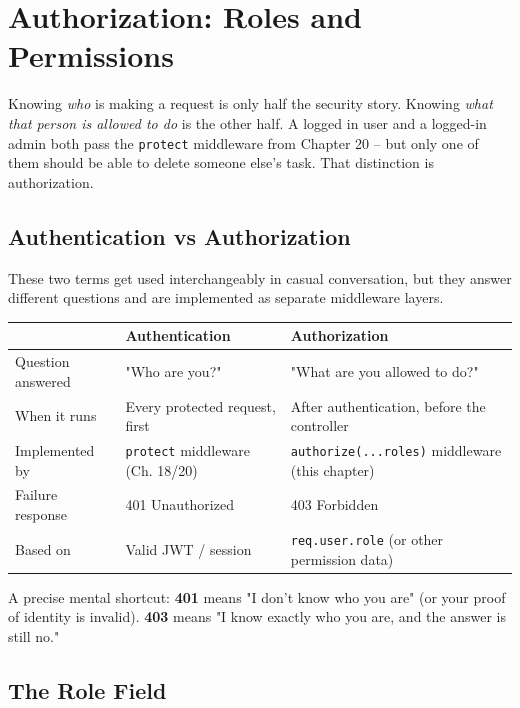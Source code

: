 \chapter{Authorization: Roles and Permissions}

Knowing \emph{who} is making a request is only half the security story.
Knowing \emph{what that person is allowed to do} is the other half. A logged
in user and a logged-in admin both pass the \texttt{protect} middleware from
Chapter 20 -- but only one of them should be able to delete someone else's
task. That distinction is authorization.

\section{Authentication vs Authorization}

These two terms get used interchangeably in casual conversation, but they
answer different questions and are implemented as separate middleware layers.

\begin{center}
\begin{tabularx}{\textwidth}{lXX}
\toprule
\textbf{} & \textbf{Authentication} & \textbf{Authorization} \\
\midrule
Question answered & "Who are you?" & "What are you allowed to do?" \\
When it runs & Every protected request, first & After authentication, before the controller \\
Implemented by & \texttt{protect} middleware (Ch. 18/20) & \texttt{authorize(...roles)} middleware (this chapter) \\
Failure response & 401 Unauthorized & 403 Forbidden \\
Based on & Valid JWT / session & \texttt{req.user.role} (or other permission data) \\
\bottomrule
\end{tabularx}
\end{center}

\begin{notebox}[NOTE]
A precise mental shortcut: \textbf{401} means "I don't know who you are" (or
your proof of identity is invalid). \textbf{403} means "I know exactly who
you are, and the answer is still no."
\end{notebox}

\section{The Role Field}

